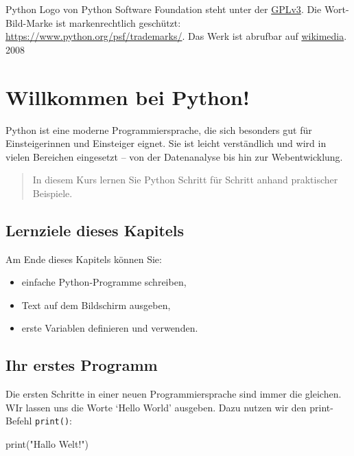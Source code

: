 \documentclass[
  letterpaper,
  DIV=11,
  numbers=noendperiod]{scrreprt}
\newenvironment{Shaded}{\begin{snugshade}}{\end{snugshade}}
\newcommand{\BuiltInTok}[1]{\textcolor[rgb]{0.00,0.23,0.31}{#1}}
\newcommand{\NormalTok}[1]{\textcolor[rgb]{0.00,0.23,0.31}{#1}}
\newcommand{\StringTok}[1]{\textcolor[rgb]{0.13,0.47,0.30}{#1}}
\providecommand{\tightlist}{%
  \setlength{\itemsep}{0pt}\setlength{\parskip}{0pt}}\usepackage{longtable,booktabs,array}
\begin{document}
Python Logo von Python Software Foundation steht unter der
\href{https://www.gnu.org/licenses/gpl-3.0.html}{GPLv3}. Die
Wort-Bild-Marke ist markenrechtlich geschützt:
\url{https://www.python.org/psf/trademarks/}. Das Werk ist abrufbar auf
\href{https://de.m.wikipedia.org/wiki/Datei:Python_logo_and_wordmark.svg}{wikimedia}.
2008

\chapter{Willkommen bei Python!}\label{willkommen-bei-python}

Python ist eine moderne Programmiersprache, die sich besonders gut für
Einsteigerinnen und Einsteiger eignet. Sie ist leicht verständlich und
wird in vielen Bereichen eingesetzt -- von der Datenanalyse bis hin zur
Webentwicklung.

\begin{quote}
In diesem Kurs lernen Sie Python Schritt für Schritt anhand praktischer
Beispiele.
\end{quote}

\section{Lernziele dieses Kapitels}\label{lernziele-dieses-kapitels}

Am Ende dieses Kapitels können Sie:

\begin{itemize}
\tightlist
\item
  einfache Python-Programme schreiben,
\item
  Text auf dem Bildschirm ausgeben,
\item
  erste Variablen definieren und verwenden.
\end{itemize}

\section{Ihr erstes Programm}\label{ihr-erstes-programm}

Die ersten Schritte in einer neuen Programmiersprache sind immer die
gleichen. WIr lassen uns die Worte `Hello World' ausgeben. Dazu nutzen
wir den print-Befehl \texttt{print()}:

\begin{Shaded}
\begin{Highlighting}[]
\BuiltInTok{print}\NormalTok{(}\StringTok{"Hallo Welt!"}\NormalTok{)}
\end{Highlighting}
\end{Shaded}
\end{document}
